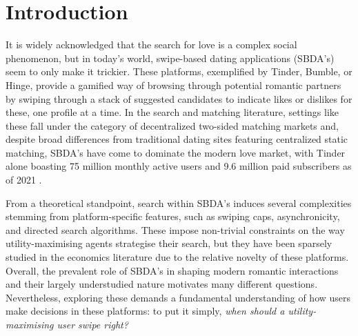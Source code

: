 \section{Introduction}
\label{sec:section1}
It is widely acknowledged that the search for love is a complex social phenomenon, but in today's world, swipe-based dating applications (SBDA's) seem to only make it trickier.
These platforms, exemplified by Tinder, Bumble, or Hinge, provide a gamified way of browsing through potential romantic partners by swiping through a stack of suggested candidates to indicate likes or dislikes for these, one profile at a time.  In the search and matching literature, settings like these fall under the category of decentralized two-sided matching markets \citep{kanoria2021facilitating} and, despite broad differences from traditional dating sites featuring centralized static matching, SBDA's have come to dominate the modern love market, with Tinder alone boasting 75 million monthly active users and 9.6 million paid subscribers as of 2021 \citep{web:tinder_stats}.

From a theoretical standpoint, search within SBDA's induces several complexities stemming from platform-specific features, such as swiping caps, asynchronicity, and directed search algorithms.
These impose non-trivial constraints on the way utility-maximising agents strategise their search, but they have been sparsely studied in the economics literature due to the relative novelty of these platforms.
Overall, the prevalent role of SBDA's in shaping modern romantic interactions and their largely understudied nature motivates many different questions.
Nevertheless, exploring these demands a fundamental understanding of how users make decisions in these platforms: to put it simply, \textit{when should a utility-maximising user swipe right?}

